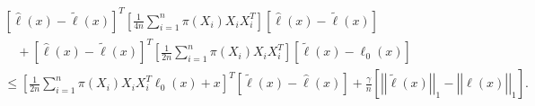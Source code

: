 \documentclass[10pt,a4paper]{amsart}
\theoremstyle{plain}
\theoremstyle{remark}
\renewcommand{\hat}{\widehat}
\renewcommand{\tilde}{\widetilde}
\newcommand{\norm}[1]{\left|\left| #1 \right|\right|}
\begin{document}
	\begin{align}
		\label{dual_taylor}
		\begin{split}
			&\left[\hat{\ell}(x) - \tilde{\ell}(x)\right]^T \left[\frac{1}{4n}\sum_{i=1}^n \pi(X_i) X_iX_i^T \right] \left[\hat{\ell}(x) - \tilde{\ell}(x)\right] \\
			&\quad + \left[\hat{\ell}(x) - \tilde{\ell}(x)\right]^T \left[\frac{1}{2n}\sum_{i=1}^n \pi(X_i) X_iX_i^T \right] \left[\tilde{\ell}(x) - \ell_0(x)\right]\\
			&\leq \left[\frac{1}{2n} \sum_{i=1}^n \pi(X_i) X_iX_i^T \ell_0(x) +x \right]^T \left[\tilde{\ell}(x) - \hat{\ell}(x) \right] + \frac{\gamma}{n}\left[\norm{\tilde{\ell}(x)}_1 - \norm{\hat{\ell}(x)}_1 \right].
		\end{split}
	\end{align}
\end{document}
